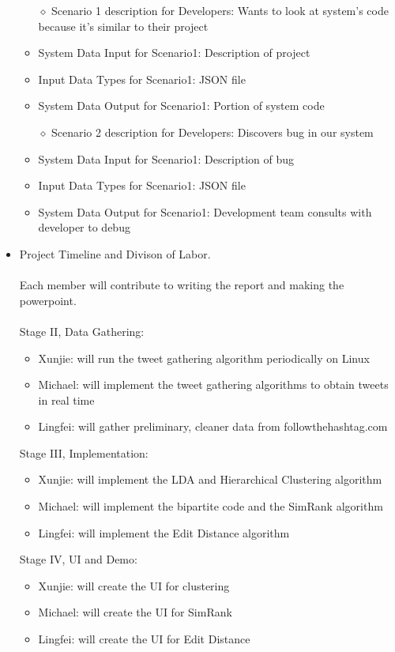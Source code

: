 \documentclass[10pt]{article}
\begin{document}
\begin{itemize}
	\begin{itemize} 
	\item[$\diamond$]{Scenario 1 description for Developers: }
	Wants to look at system's code because it's similar to their project
	\item{System Data Input for Scenario1: }
	Description of project
	\item{Input Data Types for Scenario1: }
	JSON file
	\item{System Data Output for Scenario1: }
	Portion of system code
	\end{itemize}

	\begin{itemize} 
	\item[$\diamond$]{Scenario 2 description for Developers: }
	Discovers bug in our system
	\item{System Data Input for Scenario1: }
	Description of bug
	\item{Input Data Types for Scenario1: }
	JSON file
	\item{System Data Output for Scenario1: }
	Development team consults with developer to debug
	\end{itemize}
\item{Project Timeline and Divison of Labor.}
\\\\ Each member will contribute to writing the report and making the powerpoint.
\\\\ Stage II, Data Gathering:
\begin{itemize} 
\item{Xunjie: will run the tweet gathering algorithm periodically on Linux}
\item{Michael: will implement the tweet gathering algorithms to obtain tweets in real time}
\item{Lingfei: will gather preliminary, cleaner data from followthehashtag.com}
\end{itemize}
Stage III, Implementation:
\begin{itemize} 
\item{Xunjie: will implement the LDA and Hierarchical Clustering algorithm}
\item{Michael: will implement the bipartite code and the SimRank algorithm}
\item{Lingfei: will implement the Edit Distance algorithm}
\end{itemize}
Stage IV, UI and Demo:
\begin{itemize} 
\item{Xunjie: will create the UI for clustering}
\item{Michael: will create the UI for SimRank}
\item{Lingfei: will create the UI for Edit Distance}
\end{itemize}
\end{itemize}
\end{document}
